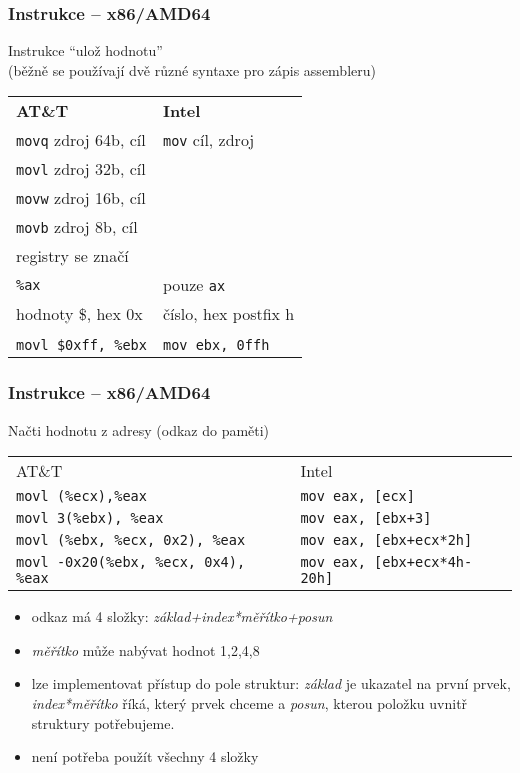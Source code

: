 \documentclass{beamer}
\begin{document}
\begin{frame}
\frametitle{Instrukce – x86/AMD64}
Instrukce ``ulož hodnotu''\\
(běžně se používají dvě různé syntaxe pro zápis assembleru)\\

\begin{tabular}{ l l }
\textbf{AT\&T} & \textbf{Intel}\\
\texttt{movq} zdroj 64b, cíl &	\texttt{mov} cíl, zdroj\\
\texttt{movl} zdroj 32b, cíl &\\
\texttt{movw} zdroj 16b, cíl &\\
\texttt{movb} zdroj 8b, cíl &\\
registry se značí &\\
\texttt{\%ax}	& pouze \texttt{ax}\\
hodnoty \$, hex 0x & číslo, hex postfix h\\
&\\
\texttt{movl \$0xff, \%ebx} & \texttt{mov ebx, 0ffh}\\
\end{tabular}
\end{frame}


\begin{frame}
\frametitle{Instrukce – x86/AMD64}
Načti hodnotu z adresy (odkaz do paměti)\\
\begin{tabular}{ l l}
AT\&T & Intel \\
\texttt{movl (\%ecx),\%eax} & \texttt{mov eax, [ecx]}\\
\texttt{movl 3(\%ebx), \%eax} & \texttt{mov eax, [ebx+3]} \\
\texttt{movl (\%ebx, \%ecx, 0x2), \%eax} & \texttt{mov eax, [ebx+ecx*2h]} \\
\texttt{movl -0x20(\%ebx, \%ecx, 0x4), \%eax} & \texttt{mov eax, [ebx+ecx*4h-20h]} \\
\end{tabular}

\begin{itemize}
\item odkaz má 4 složky: \emph{základ+index*měřítko+posun}
\item \emph{měřítko} může nabývat hodnot 1,2,4,8
\item lze implementovat přístup do pole struktur: \emph{základ} je ukazatel na první prvek, \emph{index*měřítko} říká, který prvek chceme a \emph{posun}, kterou položku uvnitř struktury potřebujeme.
\item není potřeba použít všechny 4 složky 
\end{itemize}
\end{frame}
\end{document}
